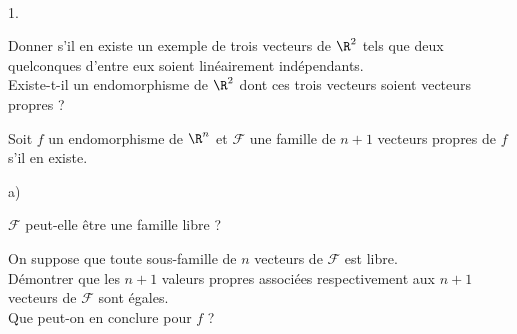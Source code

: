 \documentclass[11pt]{article}%
\begin{document}
\begin{exerciceSP}~
  \begin{noliste}{1.}
    \setlength{\itemsep}{2mm}
  \item Donner s'il en existe un exemple de trois vecteurs de $\R^{2}$
    tels que deux quelconques d'entre eux soient linéairement indépendants.\\
    Existe-t-il un endomorphisme de $\R^{2}$ dont ces trois vecteurs
    soient vecteurs propres ?

  \item Soit $f$ un endomorphisme de $\R^{n}$ et $\mathcal{F}$ une
    famille de $n+1$ vecteurs propres de $f$ s'il en existe.
    \begin{noliste}{a)}
    \setlength{\itemsep}{2mm}
    \item $\mathcal{F}$ peut-elle être une famille libre ?
    \item On suppose que toute sous-famille de $n$ vecteurs de
      $\mathcal{F}$ est libre. \\
      Démontrer que les $n+1$ valeurs propres associées respectivement
      aux $n+1$ vecteurs de $\mathcal{F}$ sont égales.\\
      Que peut-on en conclure pour $f$ ?
    \end{noliste}
  \end{noliste}
\end{exerciceSP}


\newpage
\end{document}
